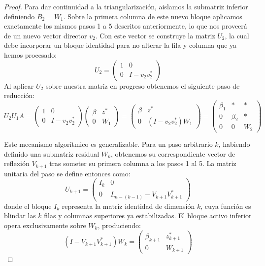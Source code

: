 \documentclass[12pt]{article}
\begin{document}
\begin{proof}
Para dar continuidad a la triangularización, aislamos la submatriz inferior definiendo $B_2 = W_1$. Sobre la primera columna de este nuevo bloque aplicamos exactamente los mismos pasos 1 a 5 descritos anteriormente, lo que nos proveerá de un nuevo vector director $v_2$. Con este vector se construye la matriz $U_2$, la cual debe incorporar un bloque identidad para no alterar la fila y columna que ya hemos procesado:
\begin{equation}
U_2 = \begin{pmatrix} 1 & 0 \\ 0 & I - v_2 v_2^* \end{pmatrix}
\end{equation}
Al aplicar $U_2$ sobre nuestra matriz en progreso obtenemos el siguiente paso de reducción:
\begin{equation}
U_2 U_1 A = \begin{pmatrix} 1 & 0 \\ 0 & I - v_2 v_2^* \end{pmatrix} \begin{pmatrix} \beta & z^* \\ 0 & W_1 \end{pmatrix} = \begin{pmatrix} \beta & z^* \\ 0 & (I - v_2 v_2^*) W_1 \end{pmatrix} = \begin{pmatrix} \beta_1 & * & * \\ 0 & \beta_2 & * \\ 0 & 0 & W_2 \end{pmatrix}
\end{equation}

Este mecanismo algorítmico es generalizable. Para un paso arbitrario $k$, habiendo definido una submatriz residual $W_k$, obtenemos su correspondiente vector de reflexión $V_{k+1}$ tras someter su primera columna a los pasos 1 al 5. La matriz unitaria del paso se define entonces como:
\begin{equation}
U_{k+1} = \begin{pmatrix} I_k & 0 \\ 0 & I_{m-(k-1)} - V_{k+1} V_{k+1}^* \end{pmatrix}
\end{equation}
donde el bloque $I_k$ representa la matriz identidad de dimensión $k$, cuya función es blindar las $k$ filas y columnas superiores ya estabilizadas. El bloque activo inferior opera exclusivamente sobre $W_k$, produciendo:
\begin{equation}
(I - V_{k+1} V_{k+1}^*) W_k = \begin{pmatrix} \beta_{k+1} & z_{k+1}^* \\ 0 & W_{k+1} \end{pmatrix}
\end{equation}


\end{proof}
\end{document}
